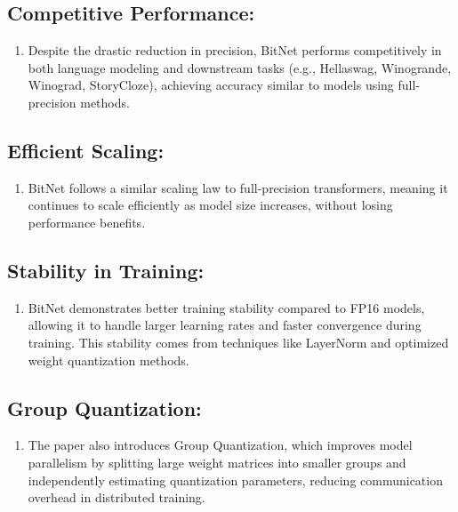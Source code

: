 \documentclass{report}
\begin{document}
	\subsection{Competitive Performance:}
	\begin{enumerate}
		\item 
		Despite the drastic reduction in precision, BitNet performs competitively in both language modeling and downstream tasks (e.g., Hellaswag, Winogrande, Winograd, StoryCloze), achieving accuracy similar to models using full-precision methods.
	\end{enumerate}
	
	\subsection{Efficient Scaling:}
	\begin{enumerate}
		\item 
		BitNet follows a similar scaling law to full-precision transformers, meaning it continues to scale efficiently as model size increases, without losing performance benefits.
	\end{enumerate}
	
	\subsection{Stability in Training:}
	\begin{enumerate}
		\item 
		BitNet demonstrates better training stability compared to FP16 models, allowing it to handle larger learning rates and faster convergence during training. This stability comes from techniques like LayerNorm and optimized weight quantization methods.
	\end{enumerate}
	
	\subsection{Group Quantization:}
	\begin{enumerate}
		\item 
		The paper also introduces Group Quantization, which improves model parallelism by splitting large weight matrices into smaller groups and independently estimating quantization parameters, reducing communication overhead in distributed training.
	\end{enumerate}
	
	
	
	
	
	
	
	
	
	
	
	
	
	
	
	
	
	
	
	
	
	
	
	
	
	
	
	
	
	
	
	
	
	
	
	\newpage
	
	
	
\end{document}

